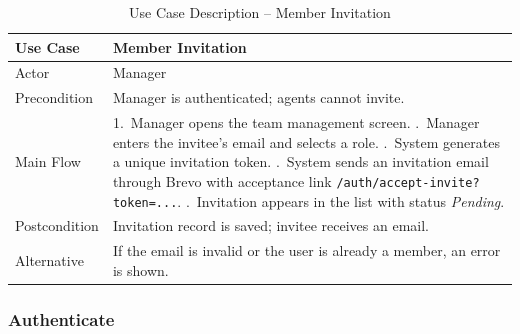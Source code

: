 \documentclass[12pt,a4paper]{report}
\newcommand{\reporttablesetup}{%
  \small%
  \setlength{\tabcolsep}{5pt}%
  \renewcommand{\arraystretch}{1.22}%
  \arrayrulecolor{framegray}%
}
\begin{document}
\begin{table}[H]
  \centering
  \reporttablesetup
  \begin{tabularx}{\textwidth}{|p{3.1cm}|Y|}
    \hline
    Use Case     & Member Invitation \\
    \hline
    Actor        & Manager \\
    \hline
    Precondition & Manager is authenticated; agents cannot invite. \\
    \hline
    Main Flow    & 1.\ Manager opens the team management screen. .\ Manager enters the invitee's email and selects a role. .\ System generates a unique invitation token. .\ System sends an invitation email through Brevo with acceptance
                       link \texttt{/auth/accept-invite?token=...}. .\ Invitation appears in the list with status \textit{Pending}. \\
    \hline
    Postcondition & Invitation record is saved; invitee receives an email. \\
    \hline
    Alternative  & If the email is invalid or the user is already a member, an error
                   is shown. \\
    \hline
  \end{tabularx}
  \caption{Use Case Description -- Member Invitation}
  \label{tab:uc03}
\end{table}

\subsubsection{Authenticate}
\end{document}
